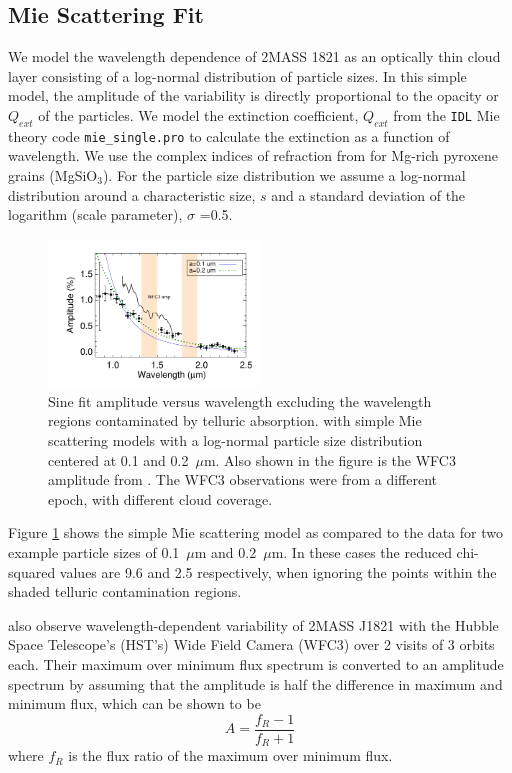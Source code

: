 \documentclass[twocolumn]{aastex6}
\begin{document}
\subsection{Mie Scattering Fit}

We model the wavelength dependence of 2MASS 1821 as an optically thin cloud layer consisting of a log-normal distribution of particle sizes.
In this simple model, the amplitude of the variability is directly proportional to the opacity or $Q_{ext}$ of the particles.
We model the extinction coefficient, $Q_{ext}$ from the \texttt{IDL} Mie theory code \texttt{mie\_single.pro} \citep{grainger04} to calculate the extinction as a function of wavelength.
We use the complex indices of refraction from \citet{dorschner95pyrox} for Mg-rich pyroxene grains (MgSiO$_3$).
For the particle size distribution we assume a log-normal distribution around a characteristic size, $s$ and a standard deviation of the logarithm (scale parameter), $\sigma$ =0.5.

\begin{figure}
\begin{centering}
\includegraphics[width=0.5\textwidth]{amp_vs_wavl_j1821_mie_sc.pdf}
\caption{Sine fit amplitude versus wavelength excluding the wavelength regions contaminated by telluric absorption. with simple Mie scattering models with a log-normal particle size distribution centered at 0.1 and 0.2~$\mu$m. Also shown in the figure is the WFC3 amplitude from \citet{2015ApJ...798L..13Y}. The WFC3 observations were from a different epoch, with different cloud coverage.}\label{fig:ampspec1821mie}
\end{centering}
\end{figure}

Figure \ref{fig:ampspec1821mie} shows the simple Mie scattering model as compared to the data for two example particle sizes of 0.1~$\mu$m and 0.2~$\mu$m.
In these cases the reduced chi-squared values are 9.6 and 2.5 respectively, when ignoring the points within the shaded telluric contamination regions.

\citet{2015ApJ...798L..13Y} also observe wavelength-dependent variability of 2MASS J1821 with the Hubble Space Telescope's (HST's) Wide Field Camera (WFC3) over 2 visits of 3 orbits each.
Their maximum over minimum flux spectrum is converted to an amplitude spectrum by assuming that the amplitude is half the difference in maximum and minimum flux, which can be shown to be 
\begin{equation}
A  = \frac{f_R - 1}{f_R + 1}
\end{equation}\label{eq:ampFromRatio}
where $f_R$ is the flux ratio of the maximum over minimum flux.
\end{document}
